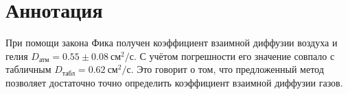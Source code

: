 \chapter*{Аннотация}

При помощи закона Фика получен коэффициент взаимной диффузии воздуха и гелия $D_{\text{атм}} = 0.55 \pm 0.08~\text{см}^2/\text{с}$. С учётом погрешности его значение совпало с табличным $D_{\text{табл}} = 0.62~\text{см}^2/\text{с}$. Это говорит о том, что предложенный метод позволяет достаточно точно определить коэффициент взаимной диффузии газов. 